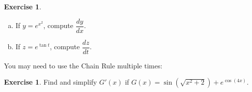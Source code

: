 \documentclass[11pt,reqno,final]{amsart}
\numberwithin{figure}{section}
\theoremstyle{definition} %
\newtheorem{exercise}[question]{Exercise}
\begin{document}
\newpage

\begin{exercise}
        \begin{enumerate}[(a)]
        \item If $y = e^{x^2}$, compute $\dfrac{dy}{dx}$.
                \vfill
        \item If $z = e^{\tan t}$, compute $\dfrac{dz}{dt}$.
                \vfill
        \end{enumerate}
\end{exercise}

You may need to use the Chain Rule multiple times:
\begin{exercise}
        Find and simplify $G'(x)$ if $G(x) = \sin\left( \sqrt{x^2+2} \right) + e^{\cos(4x)}$.
        \vfill
\end{exercise}

        
\end{document}
